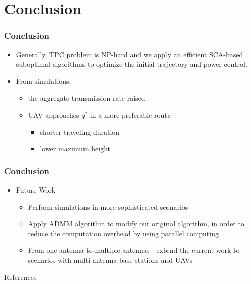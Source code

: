 \documentclass[11.5pt]{beamer}
\begin{document}
\section{Conclusion}
\begin{frame}
	\frametitle{Conclusion}
	\begin{itemize}\itemsep 2em
		\item<1-> Generally, TPC problem is NP-hard and we apply an efficient SCA-based suboptimal algorithms to optimize the initial trajectory and power control.
		\item<2-> From simulations,
		\begin{itemize}
			\item the aggregate transmission rate raised
			\item UAV approaches $q^*$ in a more preferable route 
			\begin{itemize}
				\item shorter traveling duration
				\item lower maximum height
			\end{itemize}
		\end{itemize}
	\end{itemize}
\end{frame}
\begin{frame}
	\frametitle{Conclusion}
	\begin{itemize}
		\item Future Work
		\begin{itemize}\itemsep 0.5em
			\item Perform simulations in more sophisticated scenarios
			\item Apply ADMM algorithm to modify our original algorithm, in order to reduce the computation overhead by using parallel computing
			\item From one antenna to multiple antennas - extend the current work to scenarios with multi-antenna base stations and UAVs 
		\end{itemize}
	\end{itemize}
\end{frame}

\begin{frame}{References}
	\nocite{IEEEexample:shen2018multi}
	\nocite{IEEEexample:zeng2016wireless}
	\nocite{IEEEexample:7888557}
	\nocite{IEEEexample:li2019uav}
	
	
\end{frame}

	
	
	
	
	
	
	
\end{document}
